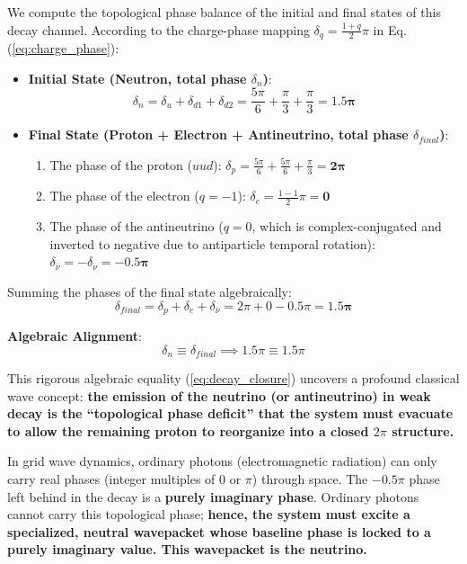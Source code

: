 \documentclass[12pt, a4paper]{article}
\begin{document}
We compute the topological phase balance of the initial and final states of this decay channel. According to the charge-phase mapping $\delta_q = \frac{1+q}{2}\pi$ in Eq. (\ref{eq:charge_phase}):
\begin{itemize}
    \item \textbf{Initial State (Neutron, total phase $\delta_n$)}:
    \begin{equation}
    \delta_n = \delta_u + \delta_{d1} + \delta_{d2} = \frac{5\pi}{6} + \frac{\pi}{3} + \frac{\pi}{3} = \mathbf{1.5\pi} \label{eq:n_phase_decay}
    \end{equation}
    
    \item \textbf{Final State (Proton + Electron + Antineutrino, total phase $\delta_{final}$)}:
    \begin{enumerate}
        \item The phase of the proton ($uud$): $\delta_p = \frac{5\pi}{6} + \frac{5\pi}{6} + \frac{\pi}{3} = \mathbf{2\pi}$
        \item The phase of the electron ($q=-1$): $\delta_e = \frac{1-1}{2}\pi = \mathbf{0}$
        \item The phase of the antineutrino ($q=0$, which is complex-conjugated and inverted to negative due to antiparticle temporal rotation): $\delta_{\bar{\nu}} = -\delta_\nu = \mathbf{-0.5\pi}$
    \end{enumerate}
\end{itemize}
Summing the phases of the final state algebraically:
\begin{equation}
\delta_{final} = \delta_p + \delta_e + \delta_{\bar{\nu}} = 2\pi + 0 - 0.5\pi = \mathbf{1.5\pi} \label{eq:final_phase_decay}
\end{equation}

\textbf{Algebraic Alignment}:
\begin{equation}
\delta_n \equiv \delta_{final} \implies 1.5\pi \equiv 1.5\pi \label{eq:decay_closure}
\end{equation}

This rigorous algebraic equality (\ref{eq:decay_closure}) uncovers a profound classical wave concept: \textbf{the emission of the neutrino (or antineutrino) in weak decay is the ``topological phase deficit'' that the system must evacuate to allow the remaining proton to reorganize into a closed $2\pi$ structure.}

In grid wave dynamics, ordinary photons (electromagnetic radiation) can only carry real phases (integer multiples of $0$ or $\pi$) through space. The $-0.5\pi$ phase left behind in the decay is a \textbf{purely imaginary phase}. Ordinary photons cannot carry this topological phase; \textbf{hence, the system must excite a specialized, neutral wavepacket whose baseline phase is locked to a purely imaginary value. This wavepacket is the neutrino.}
\end{document}
